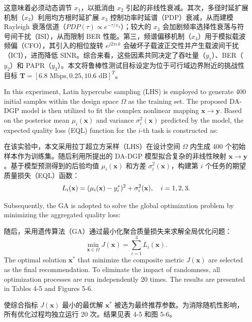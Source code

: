 \documentclass[11pt]{article}
\begin{document}
这意味着必须动态调节 ${{x}_{1}}$，以抵消由 ${{x}_{2}}$ 引起的非线性衰减。其次，多径时延扩展机制（${{x}_{3}}$）利用均方根时延扩展 ${{x}_{3}}$ 控制功率时延谱（PDP）衰减，从而建模 Rayleigh 衰落信道（$PDP(\tau )\propto {{e}^{-\tau /{{x}_{3}}}}$）；较大的 ${{x}_{3}}$ 会加剧频率选择性衰落与符号间干扰（ISI），从而限制 BER 性能。第三，频谱偏移机制（${{x}_{4}}$）用于模拟载波频偏（CFO），其引入的相位旋转 ${{e}^{j2\pi \varepsilon k}}$ 会破坏子载波正交性并产生载波间干扰（ICI），进而降低 SINR。综合来看，这些因素共同决定了吞吐量（${{y}_{1}}$）、BER（${{y}_{2}}$）和 PAPR（${{y}_{3}}$）。本文将鲁棒性测试目标设定为位于可行域边界附近的挑战性目标 $\mathbf{T}={{[6.8\text{ Mbps}, 0.25, 10.6\text{ dB}]}^{T}}$。

In this experiment, Latin hypercube sampling (LHS) is employed to generate 400 initial samples within the design space $\Omega$ as the training set. The proposed DA-DGP model is then utilized to fit the complex nonlinear mapping $\mathbf{x} \to \mathbf{y}$. Based on the posterior mean $\mu_{i}(\mathbf{x})$ and variance $\sigma_{i}^{2}(\mathbf{x})$ predicted by the model, the expected quality loss (EQL) function for the $i$-th task is constructed as:

在该实验中，本文采用拉丁超立方采样（LHS）在设计空间 $\Omega$ 内生成 400 个初始样本作为训练集。随后利用所提出的 DA-DGP 模型拟合复杂的非线性映射 $\mathbf{x} \to \mathbf{y}$。基于模型预测得到的后验均值 $\mu_{i}(\mathbf{x})$ 和方差 $\sigma_{i}^{2}(\mathbf{x})$，构建第 $i$ 个任务的期望质量损失（EQL）函数：
\begin{equation}
	{L_i}({\bf{x}}) = {({\mu _i}({\bf{x}}) - y_i^*)^2} + \sigma _i^2({\bf{x}}),\quad i = 1,2,3.
\end{equation}

Subsequently, the GA is adopted to solve the global optimization problem by minimizing the aggregated quality loss:

随后，采用遗传算法（GA）通过最小化聚合质量损失来求解全局优化问题：
\begin{equation}
	\min_{\mathbf{x}\in\Omega} J(\mathbf{x}) = \sum_{i=1}^{3} L_i(\mathbf{x}).
	\label{eq:opt_objective}
\end{equation}
The optimal solution  $\mathbf{x}^*$ that minimize the composite metric $J(\mathbf{x})$ are selected as the final recommendation. To eliminate the impact of randomness, all optimization processes are run independently 20 times. The results are presented in Tables 4-5 and Figures 5-6.

使综合指标 $J(\mathbf{x})$ 最小的最优解 $\mathbf{x}^*$ 被选为最终推荐参数。为消除随机性影响，所有优化过程均独立运行 20 次。结果见表 4-5 和图 5-6。
\end{document}

